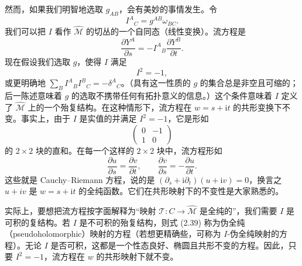 \documentclass[11pt,a4paper,UTF8]{ctexart}
\theoremstyle{plain}
\theoremstyle{definition}
\begin{document}
然而，如果我们明智地选取 $g_{AB}$，会有美妙的事情发生。令
\begin{equation}
    I^A{}_C=g^{AB}\omega_{BC}.
    \tag{2.38}
\end{equation}
我们可以把 $I$ 看作 $\widehat{\mathcal M}$ 的切丛的一个自同态（线性变换）。流方程是
\begin{equation}
    \frac{\partial Y^A}{\partial s}=-I^A{}_B\frac{\partial Y^B}{\partial t}.
    \tag{2.39}
\end{equation}
现在假设我们选取 $g$，使得 $I$ 满足
\begin{equation}
    I^2=-1,
    \tag{2.40}
\end{equation}
或更明确地 $\sum_B I^A{}_B I^B{}_C=-\delta^A{}_C$。（具有这一性质的 $g$ 的集合总是非空且可缩的；后一陈述意味着 $g$ 的选取不携带任何有拓扑意义的信息。）这个条件意味着 $I$ 定义了 $\widehat{\mathcal M}$ 上的一个殆复结构。在这种情形下，流方程在 $w=s+\mathrm{i}t$ 的共形变换下不变。事实上，由于 $I$ 是实值的并满足 $I^2=-1$，它是形如
\begin{equation}
    \begin{pmatrix}
        0 & -1\\
        1 & 0
    \end{pmatrix}
    \tag{2.41}
\end{equation}
的 $2\times2$ 块的直和。在每一个这样的 $2\times2$ 块中，流方程形如
\begin{equation}
    \frac{\partial u}{\partial s}=\frac{\partial v}{\partial t},
    \qquad
    \frac{\partial v}{\partial s}=-\frac{\partial u}{\partial t}.
    \tag{2.42}
\end{equation}
这些就是 Cauchy--Riemann 方程，说的是 $(\partial_s+\mathrm{i}\partial_t)(u+\mathrm{i}v)=0$，换言之 $u+iv$ 是 $w=s+\mathrm{i}t$ 的全纯函数。它们在共形映射下的不变性是大家熟悉的。



实际上，要想把流方程按字面解释为“映射 $\mathcal T:C\to\widehat{\mathcal M}$ 是全纯的”，我们需要 $I$ 是可积的复结构。若 $I$ 是不可积的殆复结构，则式 (2.39) 称为伪全纯（pseudoholomorphic）映射的方程（若想更精确些，可称为 $I$-伪全纯映射的方程）。无论 $I$ 是否可积，这都是一个性态良好、椭圆且共形不变的方程。因此，只要 $I^2=-1$，流方程在 $w$ 的共形映射下就不变。
\end{document}
